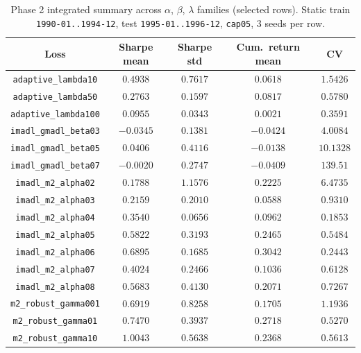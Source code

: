 \begin{table}[H]
\centering
\caption{Phase 2 integrated summary across $\alpha$, $\beta$, $\lambda$ families (selected rows). Static train \texttt{1990-01..1994-12}, test \texttt{1995-01..1996-12}, \texttt{cap05}, 3 seeds per row.}
\label{tab:integrated-summary}
\begin{tabular}{ccccc}
\toprule
Loss & Sharpe mean & Sharpe std & Cum.\ return mean & CV \\
\midrule
\texttt{adaptive\_lambda10} & $0.4938$ & $0.7617$ & $0.0618$ & $1.5426$ \\
\texttt{adaptive\_lambda50} & $0.2763$ & $0.1597$ & $0.0817$ & $0.5780$ \\
\texttt{adaptive\_lambda100} & $0.0955$ & $0.0343$ & $0.0021$ & $0.3591$ \\
\texttt{imadl\_gmadl\_beta03} & $-0.0345$ & $0.1381$ & $-0.0424$ & $4.0084$ \\
\texttt{imadl\_gmadl\_beta05} & $0.0406$ & $0.4116$ & $-0.0138$ & $10.1328$ \\
\texttt{imadl\_gmadl\_beta07} & $-0.0020$ & $0.2747$ & $-0.0409$ & $139.51$ \\
\texttt{imadl\_m2\_alpha02} & $0.1788$ & $1.1576$ & $0.2225$ & $6.4735$ \\
\texttt{imadl\_m2\_alpha03} & $0.2159$ & $0.2010$ & $0.0588$ & $0.9310$ \\
\texttt{imadl\_m2\_alpha04} & $0.3540$ & $0.0656$ & $0.0962$ & $0.1853$ \\
\texttt{imadl\_m2\_alpha05} & $0.5822$ & $0.3193$ & $0.2465$ & $0.5484$ \\
\texttt{imadl\_m2\_alpha06} & $\mathbf{0.6895}$ & $0.1685$ & $\mathbf{0.3042}$ & $\mathbf{0.2443}$ \\
\texttt{imadl\_m2\_alpha07} & $0.4024$ & $0.2466$ & $0.1036$ & $0.6128$ \\
\texttt{imadl\_m2\_alpha08} & $0.5683$ & $0.4130$ & $0.2071$ & $0.7267$ \\
\texttt{m2\_robust\_gamma001} & $0.6919$ & $0.8258$ & $0.1705$ & $1.1936$ \\
\texttt{m2\_robust\_gamma01} & $0.7470$ & $0.3937$ & $0.2718$ & $0.5270$ \\
\texttt{m2\_robust\_gamma10} & $1.0043$ & $0.5638$ & $0.2368$ & $0.5613$ \\
\bottomrule
\end{tabular}
\end{table}


